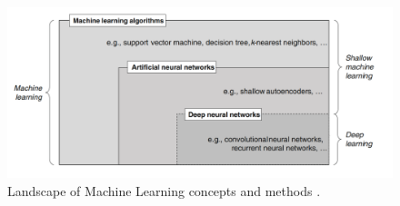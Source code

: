 \begin{figure}[H]
\begin{centering}
\includegraphics[width=15cm]{assets/images/ML_concepts}
\par\end{centering}
\caption{Landscape of Machine Learning concepts and methods \cite{janiesch2021machine}. \label{fig:ML_concepts}}
\end{figure}

